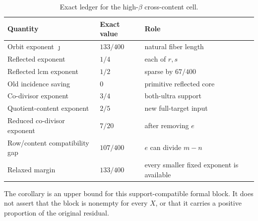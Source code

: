 \begin{table}[H]
\centering
\caption{Exact ledger for the high-$\beta$ cross-content cell.}
\label{tab:tpc30-high-ledger}
\begin{tabular}{@{}lll@{}}
\toprule
Quantity & Exact value & Role \\
\midrule
Orbit exponent $\jmath$ & $133/400$ & natural fiber length \\
Reflected exponent & $1/4$ & each of $r,s$ \\
Reflected lcm exponent & $1/2$ & sparse by $67/400$ \\
Old incidence saving & $0$ & primitive reflected core \\
Co-divisor exponent & $3/4$ & both-ultra support \\
Quotient-content exponent & $2/5$ & new full-target input \\
Reduced co-divisor exponent & $7/20$ & after removing $e$ \\
Row/content compatibility gap & $107/400$ & $e$ can divide $m-n$ \\
Relaxed margin & $133/400$ & every smaller fixed exponent is available \\
\bottomrule
\end{tabular}
\end{table}

The corollary is an upper bound for this support-compatible formal block.
It does not assert that the block is nonempty for every $X$, or that
it carries a positive proportion of the original residual.
